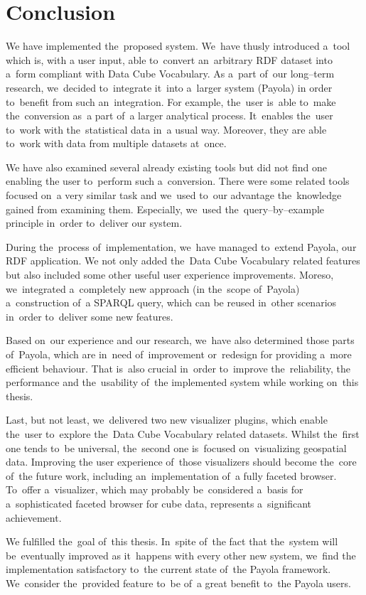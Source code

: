 \chapter*{Conclusion}

We have implemented the~proposed system. We~have thusly introduced a~tool which is, with
a user input, able to~convert an~arbitrary RDF dataset into a~form compliant with Data Cube Vocabulary.
As a~part of~our long--term research, we~decided to~integrate it~into a~larger system (Payola)
in order to~benefit from such an~integration.
For example, the~user is~able to~make the~conversion as~a part of~a larger 
analytical process. It~enables the~user to~work with the~statistical data in~a 
usual way. Moreover, they are able to~work with data from multiple datasets at~once.

We have also examined several already existing tools but did not find one enabling
the user to~perform such a~conversion. There were some related tools 
focused on~a very similar task and we~used to~our advantage the~knowledge gained from
examining them. Especially, we~used the~query--by--example principle in~order to~deliver our system.

During the~process of~implementation, we~have managed to~extend Payola, our RDF application. 
We not only added the~Data Cube Vocabulary related features but also included some 
other useful user experience improvements. Moreso, we~integrated a~completely 
new approach (in the~scope of~Payola) a~construction of~a SPARQL query, which can 
be reused in~other scenarios in~order to~deliver some new features.

Based on~our experience and our research, we~have also determined those parts of~Payola, which are in~need of~improvement or~redesign for providing a~more 
efficient behaviour. That is~also crucial in~order to~improve the~reliability, 
the performance and the~usability of~the implemented system while working on~this 
thesis.

Last, but not least, we~delivered two new visualizer plugins, which enable the~user to~explore the~Data Cube Vocabulary related datasets. Whilst the~first one tends to~be 
universal, the~second one is~focused on~visualizing geospatial data. Improving 
the user experience of~those visualizers should become the~core of~the future work, 
including an~implementation of~a fully faceted browser. To~offer a~visualizer,
which may probably be~considered a~basis for a~sophisticated faceted browser for cube data,
represents a~significant achievement.

We fulfilled the~goal of~this thesis. In~spite of~the fact that the~system will be~eventually improved
as it~happens with every other new system, we~find
the implementation satisfactory to~the current state of~the Payola framework. We~consider the~provided feature to~be of~a great benefit to~the Payola users.
